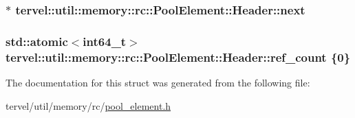 \subsubsection[{next}]{$\ast$ tervel\+::util\+::memory\+::rc\+::\+Pool\+Element\+::\+Header\+::next}\label{structtervel_1_1util_1_1memory_1_1rc_1_1_pool_element_1_1_header_a2beae3087068869d894899bba1f1fcad}
\hypertarget{structtervel_1_1util_1_1memory_1_1rc_1_1_pool_element_1_1_header_a69dc8b5b09349d7344156b80226b22bc}{}
\subsubsection[{ref\+\_\+count}]{\setlength{\rightskip}{0pt plus 5cm}std\+::atomic$<$int64\+\_\+t$>$ tervel\+::util\+::memory\+::rc\+::\+Pool\+Element\+::\+Header\+::ref\+\_\+count \{0\}}\label{structtervel_1_1util_1_1memory_1_1rc_1_1_pool_element_1_1_header_a69dc8b5b09349d7344156b80226b22bc}


The documentation for this struct was generated from the following file\+:\begin{DoxyCompactItemize}
\item 
tervel/util/memory/rc/\hyperlink{pool__element_8h}{pool\+\_\+element.\+h}\end{DoxyCompactItemize}
